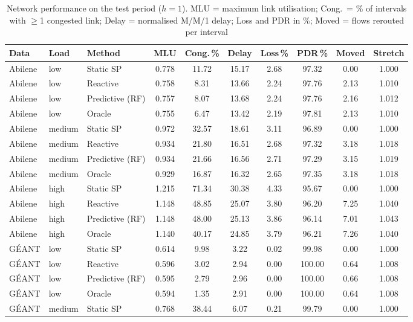 \begin{table}[t]
\centering
\caption{Network performance on the test period ($h=1$). MLU = maximum link utilisation; Cong.\ = \% of intervals with $\ge$1 congested link; Delay = normalised M/M/1 delay; Loss and PDR in \%; Moved = flows rerouted per interval}
\label{tab:route}
\scriptsize\setlength{\tabcolsep}{2.5pt}
\begin{tabular}{@{}lllccccccc@{}}
\toprule
Data & Load & Method & MLU & Cong.\,\% & Delay & Loss\,\% & PDR\,\% & Moved & Stretch \\
\midrule
Abilene & low & Static SP & 0.778 & 11.72 & 15.17 & 2.68 & 97.32 & 0.00 & 1.000 \\
Abilene & low & Reactive & 0.758 & 8.31 & 13.66 & 2.24 & 97.76 & 2.13 & 1.010 \\
Abilene & low & Predictive (RF) & 0.757 & 8.07 & 13.68 & 2.24 & 97.76 & 2.16 & 1.012 \\
Abilene & low & Oracle & 0.755 & 6.47 & 13.42 & 2.19 & 97.81 & 2.13 & 1.010 \\
Abilene & medium & Static SP & 0.972 & 32.57 & 18.61 & 3.11 & 96.89 & 0.00 & 1.000 \\
Abilene & medium & Reactive & 0.934 & 21.80 & 16.51 & 2.68 & 97.32 & 3.18 & 1.018 \\
Abilene & medium & Predictive (RF) & 0.934 & 21.66 & 16.56 & 2.71 & 97.29 & 3.15 & 1.019 \\
Abilene & medium & Oracle & 0.929 & 16.87 & 16.32 & 2.65 & 97.35 & 3.18 & 1.018 \\
Abilene & high & Static SP & 1.215 & 71.34 & 30.38 & 4.33 & 95.67 & 0.00 & 1.000 \\
Abilene & high & Reactive & 1.148 & 48.85 & 25.07 & 3.80 & 96.20 & 7.25 & 1.040 \\
Abilene & high & Predictive (RF) & 1.148 & 48.00 & 25.13 & 3.86 & 96.14 & 7.01 & 1.043 \\
Abilene & high & Oracle & 1.140 & 40.17 & 24.85 & 3.79 & 96.21 & 7.26 & 1.040 \\
G\'EANT & low & Static SP & 0.614 & 9.98 & 3.22 & 0.02 & 99.98 & 0.00 & 1.000 \\
G\'EANT & low & Reactive & 0.596 & 3.02 & 2.94 & 0.00 & 100.00 & 0.64 & 1.008 \\
G\'EANT & low & Predictive (RF) & 0.595 & 2.79 & 2.96 & 0.00 & 100.00 & 0.66 & 1.008 \\
G\'EANT & low & Oracle & 0.594 & 1.35 & 2.91 & 0.00 & 100.00 & 0.64 & 1.008 \\
G\'EANT & medium & Static SP & 0.768 & 38.44 & 6.07 & 0.21 & 99.79 & 0.00 & 1.000 \\

\end{tabular}
\end{table}
